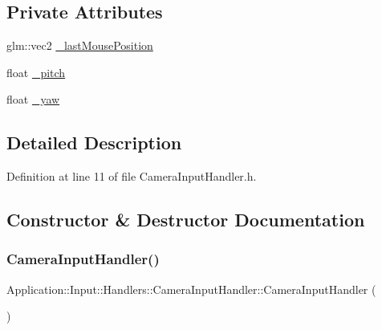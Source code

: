 \subsection*{Private Attributes}
\begin{DoxyCompactItemize}
\item 
glm\+::vec2 \mbox{\hyperlink{classApplication_1_1Input_1_1Handlers_1_1CameraInputHandler_ae8e329dd433afb42e5f53b5937a927fb}{\+\_\+last\+Mouse\+Position}}
\item 
float \mbox{\hyperlink{classApplication_1_1Input_1_1Handlers_1_1CameraInputHandler_a0157ef737743b53e5db833012cd27372}{\+\_\+pitch}}
\item 
float \mbox{\hyperlink{classApplication_1_1Input_1_1Handlers_1_1CameraInputHandler_a2fa09dcae6ed67d452d374a9fb629349}{\+\_\+yaw}}
\end{DoxyCompactItemize}


\subsection{Detailed Description}


Definition at line 11 of file Camera\+Input\+Handler.\+h.



\subsection{Constructor \& Destructor Documentation}
\mbox{\label{classApplication_1_1Input_1_1Handlers_1_1CameraInputHandler_a1863bafdf1002ddebe45795112c4c324}} 
\subsubsection{\texorpdfstring{Camera\+Input\+Handler()}{CameraInputHandler()}}
{\footnotesize\ttfamily Application\+::\+Input\+::\+Handlers\+::\+Camera\+Input\+Handler\+::\+Camera\+Input\+Handler (\begin{DoxyParamCaption}{ }\end{DoxyParamCaption})}



